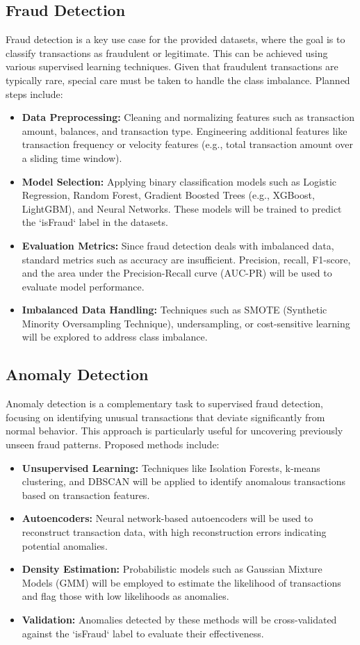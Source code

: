 \documentclass[12pt,a4paper, hidelinks]{article}
\begin{document}
\subsection{Fraud Detection}
Fraud detection is a key use case for the provided datasets, where the goal is to classify transactions as fraudulent or legitimate. This can be achieved using various supervised learning techniques. Given that fraudulent transactions are typically rare, special care must be taken to handle the class imbalance. Planned steps include:
\begin{itemize}
    \item \textbf{Data Preprocessing:} Cleaning and normalizing features such as transaction amount, balances, and transaction type. Engineering additional features like transaction frequency or velocity features (e.g., total transaction amount over a sliding time window).
    \item \textbf{Model Selection:} Applying binary classification models such as Logistic Regression, Random Forest, Gradient Boosted Trees (e.g., XGBoost, LightGBM), and Neural Networks. These models will be trained to predict the `isFraud` label in the datasets.
    \item \textbf{Evaluation Metrics:} Since fraud detection deals with imbalanced data, standard metrics such as accuracy are insufficient. Precision, recall, F1-score, and the area under the Precision-Recall curve (AUC-PR) will be used to evaluate model performance.
    \item \textbf{Imbalanced Data Handling:} Techniques such as SMOTE (Synthetic Minority Oversampling Technique), undersampling, or cost-sensitive learning will be explored to address class imbalance.
\end{itemize}

\subsection{Anomaly Detection}
Anomaly detection is a complementary task to supervised fraud detection, focusing on identifying unusual transactions that deviate significantly from normal behavior. This approach is particularly useful for uncovering previously unseen fraud patterns. Proposed methods include:
\begin{itemize}
    \item \textbf{Unsupervised Learning:} Techniques like Isolation Forests, k-means clustering, and DBSCAN will be applied to identify anomalous transactions based on transaction features. 
    \item \textbf{Autoencoders:} Neural network-based autoencoders will be used to reconstruct transaction data, with high reconstruction errors indicating potential anomalies.
    \item \textbf{Density Estimation:} Probabilistic models such as Gaussian Mixture Models (GMM) will be employed to estimate the likelihood of transactions and flag those with low likelihoods as anomalies.
    \item \textbf{Validation:} Anomalies detected by these methods will be cross-validated against the `isFraud` label to evaluate their effectiveness.
\end{itemize}
\end{document}
